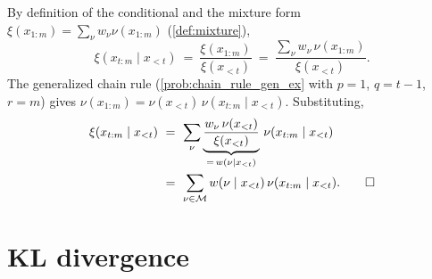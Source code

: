 \documentclass[fontsize=11pt, parskip=half]{scrartcl}
\newcommand{\Mc}{\mathcal{M}}
\begin{document}
\begin{solution}
By definition of the conditional and the mixture form $\xi(x_{1:m}) = \sum_\nu w_\nu \nu(x_{1:m})$ (\cref{def:mixture}),
\[
  \xi(x_{t:m} \mid x_{<t})
  ~=~ \frac{\xi(x_{1:m})}{\xi(x_{<t})}
  ~=~ \frac{\sum_\nu w_\nu\, \nu(x_{1:m})}{\xi(x_{<t})}.
\]
The generalized chain rule (\cref{prob:chain_rule_gen_ex} with $p=1$, $q=t-1$, $r=m$) gives $\nu(x_{1:m}) = \nu(x_{<t})\,\nu(x_{t:m} \mid x_{<t})$. Substituting,
\begin{align*}
  \xi(x_{t:m} \mid x_{<t})
  ~&=~ \sum_\nu \underbrace{\frac{w_\nu\, \nu(x_{<t})}{\xi(x_{<t})}}_{=\, w(\nu \mid x_{<t})}\, \nu(x_{t:m} \mid x_{<t}) \\
  ~&=~ \sum_{\nu \in \Mc} w(\nu \mid x_{<t})\, \nu(x_{t:m} \mid x_{<t}). \qedhere
\end{align*}
\end{solution}

\section{KL divergence}\label{prob:kl_div}

%
%
\end{document}
